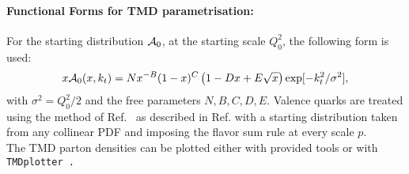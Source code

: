 \paragraph{Functional Forms for TMD parametrisation:} \rm

For the starting distribution ${\cal A}_0$, at the starting scale $Q_0^2$, 
the following form is used:
\begin{eqnarray}
x{\cal A}_0(x,\kt) = N x^{-B}(1 -x)^{C}\left(1 -D x 
+ E \sqrt{x}   \right) 
   \exp[ - k_t^2 / \sigma^2 ], 
\label{a0-5par}
\end{eqnarray}
with $ \sigma^2  =  Q_0^2 / 2 $ and the free parameters $N, B, C, D, E$.
Valence quarks are treated using the method of Ref.~\cite{Deak:2010gk} as described 
in Ref. \cite{Hautmann:2013tba} with a starting distribution taken from any collinear PDF
and imposing the flavor sum rule at every scale $p$.
\\
The TMD parton densities can be plotted either with \fitter provided tools 
or with \tt TMDplotter\rm~\cite{tmdlref}.





